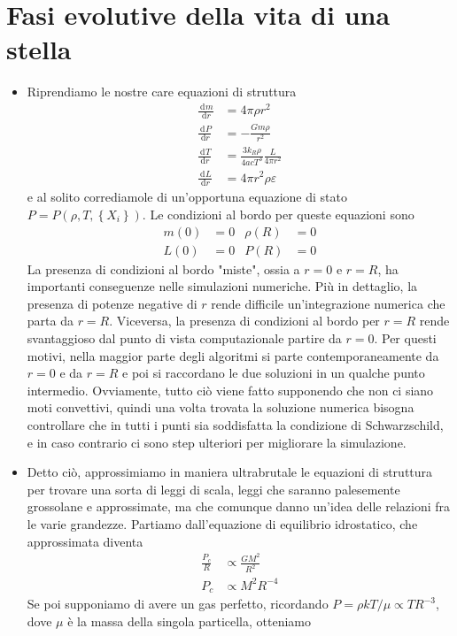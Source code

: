 \documentclass[a4paper,11pt]{article}
\renewcommand{\d}{\mathrm{d}} %
\newcommand{\der}[3][]{\frac{\d ^{#1}#2}{\d {#3}^{#1}}} %
\renewcommand{\d}{\,\mathrm{d}}
\theoremstyle{theorem}
\theoremstyle{definition}
\begin{document}
	\section{Fasi evolutive della vita di una stella}
	\begin{itemize}
		\item Riprendiamo le nostre care equazioni di struttura
		\begin{align*}
		\der{m}{r}&=4\pi \rho r^2\\
		\der{P}{r}&=-\frac{Gm\rho}{r^2}\\
		\der{T}{r}&=\frac{3k_R\rho}{4acT^3}\frac{L}{4\pi r^2}\\
		\der{L}{r}&=4\pi r^2\rho\varepsilon
		\end{align*}
		e al solito corrediamole di un'opportuna equazione di stato $P=P(\rho,T,\left\{X_i\right\})$.
		Le condizioni al bordo per queste equazioni sono
		\begin{align*}
			m(0)&=0&
			\rho(R)&=0\\
			L(0)&=0&P(R)&=0
		\end{align*}
		La presenza di condizioni al bordo "miste", ossia a $r=0$ e $r=R$, ha importanti conseguenze nelle simulazioni numeriche. Più in dettaglio, la presenza di potenze negative di $r$ rende difficile un'integrazione numerica che parta da $r=R$. Viceversa, la presenza di condizioni al bordo per $r=R$ rende svantaggioso dal punto di vista computazionale partire da $r=0$. Per questi motivi, nella maggior parte degli algoritmi si parte contemporaneamente da $r=0$ e da $r=R$ e poi si raccordano le due soluzioni in un qualche punto intermedio. Ovviamente, tutto ciò viene fatto supponendo che non ci siano moti convettivi, quindi una volta trovata la soluzione numerica bisogna controllare che in tutti i punti sia soddisfatta la condizione di Schwarzschild, e in caso contrario ci sono step ulteriori per migliorare la simulazione.
		\item Detto ciò, approssimiamo in maniera ultrabrutale le equazioni di struttura per trovare una sorta di leggi di scala, leggi che saranno palesemente grossolane e approssimate, ma che comunque danno un'idea delle relazioni fra le varie grandezze. Partiamo dall'equazione di equilibrio idrostatico, che approssimata diventa
		\begin{align*}\frac{P_c}{R}&\propto \frac{GM^2}{R^2}\\P_c&\propto M^2R^{-4}\end{align*}
		Se poi supponiamo di avere un gas perfetto, ricordando $P=\rho kT/\mu\propto TR^{-3}$, dove $\mu$ è la massa della singola particella, otteniamo

\end{itemize}
\end{document}
